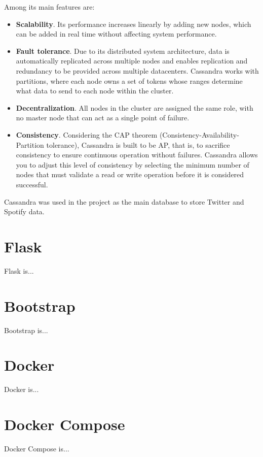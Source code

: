\nonzeroparskip Among its main features are:
\begin{itemize}
	\item \textbf{Scalability}. Its performance increases linearly by adding new nodes, which can be added in real time without affecting system performance.
	\item \textbf{Fault tolerance}. Due to its distributed system architecture, data is automatically replicated across multiple nodes and enables replication and redundancy to be provided across multiple datacenters. Cassandra works with partitions, where each node owns a set of tokens whose ranges determine what data to send to each node within the cluster.
	\item \textbf{Decentralization}. All nodes in the cluster are assigned the same role, with no master node that can act as a single point of failure.
	\item \textbf{Consistency}. Considering the CAP theorem (Consistency-Availability-Partition tolerance), Cassandra is built to be AP, that is, to sacrifice consistency to ensure continuous operation without failures. Cassandra allows you to adjust this level of consistency by selecting the minimum number of nodes that must validate a read or write operation before it is considered successful.
\end{itemize}

\nonzeroparskip Cassandra was used in the project as the main database to store Twitter and Spotify data.

\section{Flask}

\nonzeroparskip Flask is...

\section{Bootstrap}

\nonzeroparskip Bootstrap is...

\section{Docker}

\nonzeroparskip Docker is...

\section{Docker Compose}

\nonzeroparskip Docker Compose is...
